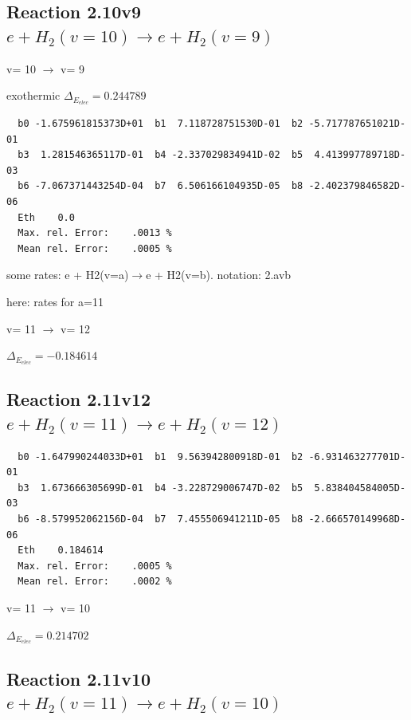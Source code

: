 \documentclass[12pt,dvipdfmx]{article}
\begin{document}
\subsection{
Reaction 2.10v9
$ e + H_2(v=10) \rightarrow e + H_2(v=9) $
}

  v=  10 $\rightarrow$ v= 9

exothermic $\Delta_{E_{elec}}= 0.244789$




\begin{small}\begin{verbatim}
  b0 -1.675961815373D+01  b1  7.118728751530D-01  b2 -5.717787651021D-01
  b3  1.281546365117D-01  b4 -2.337029834941D-02  b5  4.413997789718D-03
  b6 -7.067371443254D-04  b7  6.506166104935D-05  b8 -2.402379846582D-06
  Eth    0.0
  Max. rel. Error:    .0013 %
  Mean rel. Error:    .0005 %

\end{verbatim}\end{small}
\newpage
some rates: e + H2(v=a)$\rightarrow$e + H2(v=b). notation: 2.avb

here: rates for a=11



  v=  11 $\rightarrow$ v= 12

$\Delta_{E_{elec}}=-0.184614$


\subsection{
Reaction 2.11v12
$ e + H_2(v=11) \rightarrow e + H_2(v=12) $
}


\begin{small}\begin{verbatim}
  b0 -1.647990244033D+01  b1  9.563942800918D-01  b2 -6.931463277701D-01
  b3  1.673666305699D-01  b4 -3.228729006747D-02  b5  5.838404584005D-03
  b6 -8.579952062156D-04  b7  7.455506941211D-05  b8 -2.666570149968D-06
  Eth    0.184614
  Max. rel. Error:    .0005 %
  Mean rel. Error:    .0002 %

\end{verbatim}\end{small}

  v=  11 $\rightarrow$ v= 10

$\Delta_{E_{elec}}= 0.214702$


\subsection{
Reaction 2.11v10
$ e + H_2(v=11) \rightarrow e + H_2(v=10) $
}
\end{document}
